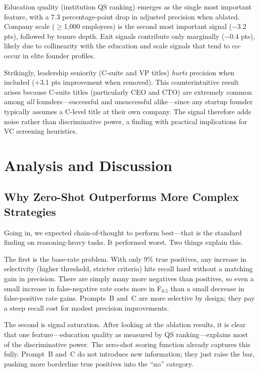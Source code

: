 \documentclass{article}
\begin{document}
Education quality (institution QS ranking) emerges as the single most important feature, with a 7.3 percentage-point drop in adjusted precision when ablated. Company scale ($\geq$1,000 employees) is the second most important signal ($-$3.2 pts), followed by tenure depth. Exit signals contribute only marginally ($-$0.4 pts), likely due to collinearity with the education and scale signals that tend to co-occur in elite founder profiles.

Strikingly, leadership seniority (C-suite and VP titles) \emph{hurts} precision when included ($+$3.1 pts improvement when removed). This counterintuitive result arises because C-suite titles (particularly CEO and CTO) are extremely common among \emph{all} founders---successful and unsuccessful alike---since any startup founder typically assumes a C-level title at their own company. The signal therefore adds noise rather than discriminative power, a finding with practical implications for VC screening heuristics.

\section{Analysis and Discussion}

\subsection{Why Zero-Shot Outperforms More Complex Strategies}

Going in, we expected chain-of-thought to perform best---that is the standard finding on reasoning-heavy tasks. It performed worst. Two things explain this.

The first is the base-rate problem. With only 9\% true positives, any increase in selectivity (higher threshold, stricter criteria) hits recall hard without a matching gain in precision. There are simply many more negatives than positives, so even a small increase in false-negative rate costs more in F$_{0.5}$ than a small decrease in false-positive rate gains. Prompts~B and~C are more selective by design; they pay a steep recall cost for modest precision improvements.

The second is signal saturation. After looking at the ablation results, it is clear that one feature---education quality as measured by QS ranking---explains most of the discriminative power. The zero-shot scoring function already captures this fully. Prompt~B and~C do not introduce new information; they just raise the bar, pushing more borderline true positives into the ``no'' category.
\end{document}
